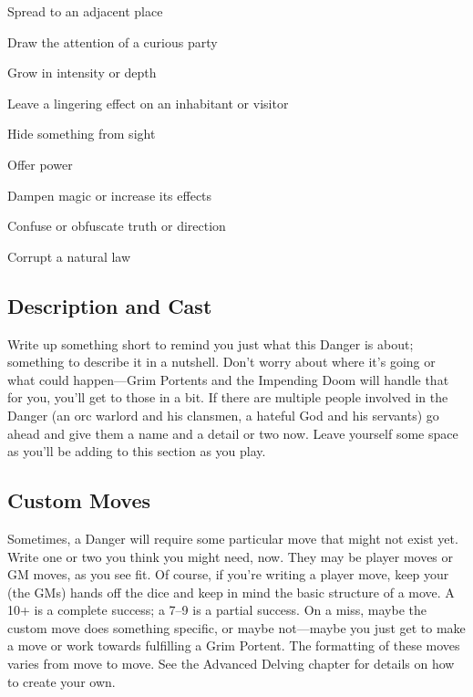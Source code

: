  
\item Spread to an adjacent place

 
\item Draw the attention of a curious party

 
\item Grow in intensity or depth

 
\item Leave a lingering effect on an inhabitant or visitor

 
\item Hide something from sight

 
\item Offer power

 
\item Dampen magic or increase its effects

 
\item Confuse or obfuscate truth or direction

 
\item Corrupt a natural law


\stopitemize
 
\subsection{Description and Cast}    
 

Write up something short to remind you just what this Danger is about; something to describe it in a nutshell. Don’t worry about where it’s going or what could happen—Grim Portents and the Impending Doom will handle that for you, you'll get to those in a bit. If there are multiple people involved in the Danger (an orc warlord and his clansmen, a hateful God and his servants) go ahead and give them a name and a detail or two now. Leave yourself some space as you'll be adding to this section as you play.

 
\subsection{Custom Moves}    
 

Sometimes, a Danger will require some particular move that might not exist yet. Write one or two you think you might need, now. They may be player moves or GM moves, as you see fit. Of course, if you're writing a player move, keep your (the GMs) hands off the dice and keep in mind the basic structure of a move. A 10+ is a complete success; a 7–9 is a partial success. On a miss, maybe the custom move does something specific, or maybe not—maybe you just get to make a move or work towards fulfilling a Grim Portent. The formatting of these moves varies from move to move. See the Advanced Delving chapter for details on how to create your own. 

